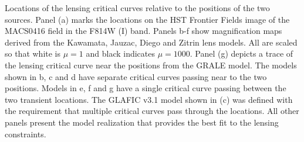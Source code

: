 \label{fig:SpockCriticalCurves}
Locations of the lensing critical curves relative to the positions of
the two \spock sources. Panel (a) marks the \spock locations on the
HST Frontier Fields image of the MACS0416 field in the F814W (I) band.
Panels b-f show magnification maps derived from the Kawamata, Jauzac,
Diego and Zitrin lens models.  All are scaled so that white is $\mu=1$
and black indicates $\mu=1000$.  Panel (g) depicts a trace of the
lensing critical curve near the \spock positions from the GRALE
model. The models shown in b, c and d have separate critical curves
passing near to the two \spock positions. Models in e, f and g have a
single critical curve passing between the two transient locations.
The GLAFIC v3.1 model shown in (c) was defined with the requirement
that multiple critical curves pass through the \spock locations.  All
other panels present the model realization that provides the best fit
to the lensing constraints.